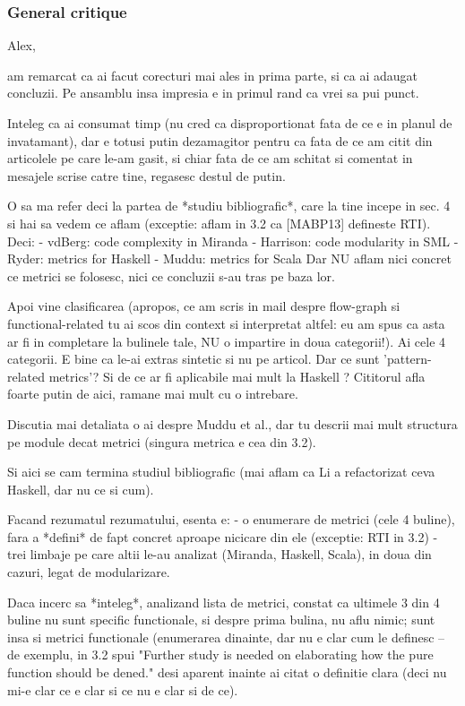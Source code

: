 \documentclass{article}
\begin{document}
\subsubsection {General critique}

Alex,

am remarcat ca ai facut corecturi mai ales in prima parte, si ca ai
adaugat concluzii.
Pe ansamblu insa impresia e in primul rand ca vrei sa pui punct.

Inteleg ca ai consumat timp (nu cred ca disproportionat fata de ce e
in planul de invatamant), dar e totusi putin dezamagitor pentru ca
fata de ce am citit din articolele pe care le-am gasit, si chiar
fata de ce am schitat si comentat in mesajele scrise catre tine,
regasesc destul de putin.

O sa ma refer deci la partea de *studiu bibliografic*, care la tine
incepe in sec. 4 si hai sa vedem ce aflam (exceptie: aflam in 3.2 ca
[MABP13] defineste RTI). Deci:
- vdBerg: code complexity in Miranda
- Harrison: code modularity in SML
- Ryder: metrics for Haskell
- Muddu: metrics for Scala
Dar NU aflam nici concret ce metrici se folosesc, nici ce concluzii
s-au tras pe baza lor.

Apoi vine clasificarea (apropos, ce am scris in mail despre flow-graph
si functional-related tu ai scos din context si interpretat altfel:
eu am spus ca asta ar fi in completare la bulinele tale, NU o impartire
in doua categorii!).
Ai cele 4 categorii. E bine ca le-ai extras sintetic si nu pe articol.
Dar ce sunt 'pattern-related metrics'? Si de ce ar fi aplicabile
mai mult la Haskell ? Cititorul afla foarte putin de aici, ramane mai
mult cu o intrebare.

Discutia mai detaliata o ai despre Muddu et al., dar tu descrii mai
mult structura pe module decat metrici (singura metrica e cea din 3.2).

Si aici se cam termina studiul bibliografic (mai aflam ca Li a
refactorizat ceva Haskell, dar nu ce si cum).

Facand rezumatul rezumatului, esenta e:
- o enumerare de metrici (cele 4 buline), fara a *defini* de fapt
concret aproape nicicare din ele (exceptie: RTI in 3.2)
- trei limbaje pe care altii le-au analizat (Miranda, Haskell, Scala),
in doua din cazuri, legat de modularizare.

Daca incerc sa *inteleg*, analizand lista de metrici, constat ca
ultimele 3 din 4 buline nu sunt specific functionale, si despre prima
bulina, nu aflu nimic; sunt insa si metrici functionale (enumerarea
dinainte, dar nu e clar cum le definesc -- de exemplu, in 3.2 spui
"Further study is needed on elaborating how the pure function should be
dened." desi aparent inainte ai citat o definitie clara (deci nu mi-e
clar ce e clar si ce nu e clar si de ce).
\end{document}
